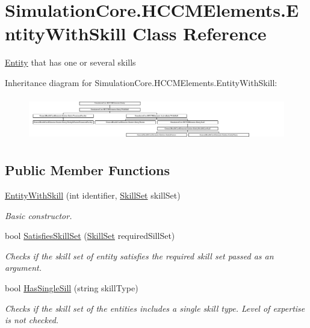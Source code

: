 \hypertarget{class_simulation_core_1_1_h_c_c_m_elements_1_1_entity_with_skill}{}\section{Simulation\+Core.\+H\+C\+C\+M\+Elements.\+Entity\+With\+Skill Class Reference}
\label{class_simulation_core_1_1_h_c_c_m_elements_1_1_entity_with_skill}


\hyperlink{class_simulation_core_1_1_h_c_c_m_elements_1_1_entity}{Entity} that has one or several skills  


Inheritance diagram for Simulation\+Core.\+H\+C\+C\+M\+Elements.\+Entity\+With\+Skill\+:\begin{figure}[H]
\begin{center}
\leavevmode
\includegraphics[height=1.926605cm]{class_simulation_core_1_1_h_c_c_m_elements_1_1_entity_with_skill}
\end{center}
\end{figure}
\subsection*{Public Member Functions}
\begin{DoxyCompactItemize}
\item 
\hyperlink{class_simulation_core_1_1_h_c_c_m_elements_1_1_entity_with_skill_a216ed7514dfd95153adb2c79ce18c4c5}{Entity\+With\+Skill} (int identifier, \hyperlink{class_simulation_core_1_1_h_c_c_m_elements_1_1_skill_set}{Skill\+Set} skill\+Set)
\begin{DoxyCompactList}\small\item\em Basic constructor. \end{DoxyCompactList}\item 
bool \hyperlink{class_simulation_core_1_1_h_c_c_m_elements_1_1_entity_with_skill_acb96e83847341f0907e3e14f7ee442b8}{Satisfies\+Skill\+Set} (\hyperlink{class_simulation_core_1_1_h_c_c_m_elements_1_1_skill_set}{Skill\+Set} required\+Sill\+Set)
\begin{DoxyCompactList}\small\item\em Checks if the skill set of entity satisfies the required skill set passed as an argument. \end{DoxyCompactList}\item 
bool \hyperlink{class_simulation_core_1_1_h_c_c_m_elements_1_1_entity_with_skill_a9613af13d6cd20d3d8fcc58a9102b903}{Has\+Single\+Sill} (string skill\+Type)
\begin{DoxyCompactList}\small\item\em Checks if the skill set of the entities includes a single skill type. Level of expertise is not checked. \end{DoxyCompactList}\end{DoxyCompactItemize}
